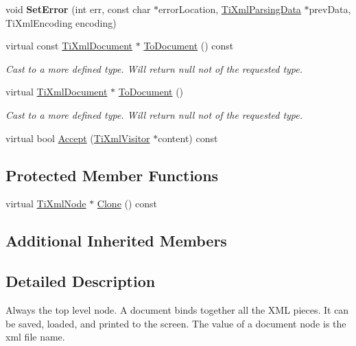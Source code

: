 \begin{DoxyCompactItemize}
\mbox{\label{classTiXmlDocument_a735c23e318597b920c94eae77fa206de}} 
void {\bfseries Set\+Error} (int err, const char $\ast$error\+Location, \hyperlink{classTiXmlParsingData}{Ti\+Xml\+Parsing\+Data} $\ast$prev\+Data, Ti\+Xml\+Encoding encoding)
\item 
\mbox{\label{classTiXmlDocument_a468e582640e3c4f740f7168d8b4a6e4a}} 
virtual const \hyperlink{classTiXmlDocument}{Ti\+Xml\+Document} $\ast$ \hyperlink{classTiXmlDocument_a468e582640e3c4f740f7168d8b4a6e4a}{To\+Document} () const
\begin{DoxyCompactList}\small\item\em Cast to a more defined type. Will return null not of the requested type. \end{DoxyCompactList}\item 
\mbox{\label{classTiXmlDocument_a1025d942a1f328fd742d545e37efdd42}} 
virtual \hyperlink{classTiXmlDocument}{Ti\+Xml\+Document} $\ast$ \hyperlink{classTiXmlDocument_a1025d942a1f328fd742d545e37efdd42}{To\+Document} ()
\begin{DoxyCompactList}\small\item\em Cast to a more defined type. Will return null not of the requested type. \end{DoxyCompactList}\item 
virtual bool \hyperlink{classTiXmlDocument_a8ddd6eec722cbd25900bbac664909bac}{Accept} (\hyperlink{classTiXmlVisitor}{Ti\+Xml\+Visitor} $\ast$content) const
\end{DoxyCompactItemize}
\subsection*{Protected Member Functions}
\begin{DoxyCompactItemize}
\item 
virtual \hyperlink{classTiXmlNode}{Ti\+Xml\+Node} $\ast$ \hyperlink{classTiXmlDocument_a46a4dda6c56eb106d46d4046ae1e5353}{Clone} () const
\end{DoxyCompactItemize}
\subsection*{Additional Inherited Members}


\subsection{Detailed Description}
Always the top level node. A document binds together all the X\+ML pieces. It can be saved, loaded, and printed to the screen. The \textquotesingle{}value\textquotesingle{} of a document node is the xml file name. 

